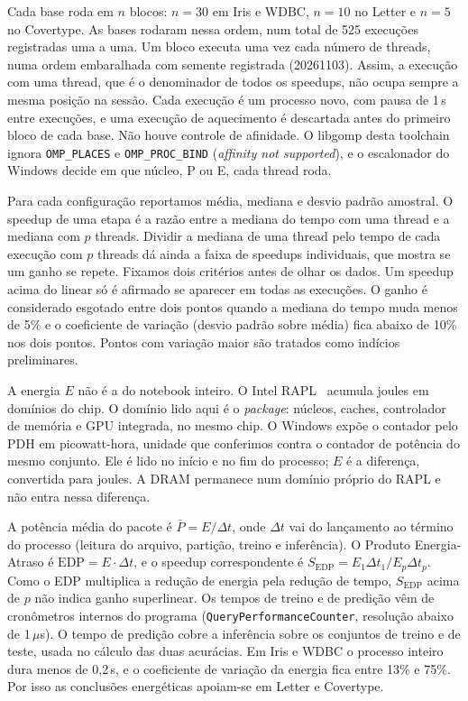 \documentclass[12pt]{article}
\begin{document}
Cada base roda em $n$ blocos: $n = 30$ em Iris e WDBC, $n = 10$ no Letter e
$n = 5$ no Covertype. As bases rodaram nessa ordem, num total de 525 execuções
registradas uma a uma. Um bloco executa uma vez cada número de threads, numa ordem
embaralhada com semente registrada (20261103). Assim, a execução com uma thread, que é o
denominador de todos os speedups, não ocupa sempre a mesma posição na sessão. Cada
execução é um processo novo, com pausa de 1\,s entre execuções, e uma execução de
aquecimento é descartada antes do primeiro bloco de cada base. Não houve controle
de afinidade. O libgomp desta toolchain ignora \texttt{OMP\_PLACES} e
\texttt{OMP\_PROC\_BIND} (\textit{affinity not supported}), e o escalonador do
Windows decide em que núcleo, P ou E, cada thread roda.

Para cada configuração reportamos média, mediana e desvio padrão amostral. O
speedup de uma etapa é a razão entre a mediana do tempo com uma thread e a mediana
com $p$ threads. Dividir a mediana de uma thread pelo tempo de cada execução com
$p$ threads dá ainda a faixa de speedups individuais, que mostra se um ganho se
repete. Fixamos dois critérios antes de olhar os dados. Um speedup acima do linear
só é afirmado se aparecer em todas as execuções. O ganho é considerado esgotado
entre dois pontos quando a mediana do tempo muda menos de 5\% e o coeficiente de
variação (desvio padrão sobre média) fica abaixo de 10\% nos dois pontos. Pontos com variação maior
são tratados como indícios preliminares.

A energia $E$ não é a do notebook inteiro. O Intel RAPL~\cite{david:2010} acumula
joules em domínios do chip. O domínio lido aqui é o \textit{package}: núcleos, caches,
controlador de memória e GPU integrada, no mesmo chip. O Windows expõe o contador pelo PDH
em picowatt-hora, unidade que conferimos contra o contador de potência do mesmo
conjunto. Ele é lido no início e no fim do processo; $E$ é a diferença, convertida
para joules. A DRAM permanece num domínio próprio do RAPL e não entra nessa
diferença.

A potência média do pacote é $\bar{P} = E/\Delta t$, onde $\Delta t$ vai do
lançamento ao término do processo (leitura do arquivo, partição, treino e
inferência).
O Produto Energia-Atraso é
$\mathrm{EDP} = E \cdot \Delta t$, e o speedup correspondente é
$S_{\mathrm{EDP}} = E_1 \Delta t_1 / E_p \Delta t_p$. Como o EDP multiplica a
redução de energia pela redução de tempo, $S_{\mathrm{EDP}}$ acima de $p$ não indica
ganho superlinear. Os tempos de treino e de predição vêm de cronômetros internos do
programa (\texttt{QueryPerformanceCounter}, resolução abaixo de 1\,$\mu$s). O tempo
de predição cobre a inferência sobre os conjuntos de treino e de teste, usada no
cálculo das duas acurácias. Em Iris e WDBC o processo inteiro dura menos de 0{,}2\,s, e o
coeficiente de variação da energia fica entre 13\% e 75\%. Por isso as conclusões
energéticas apoiam-se em Letter e Covertype.
\end{document}
